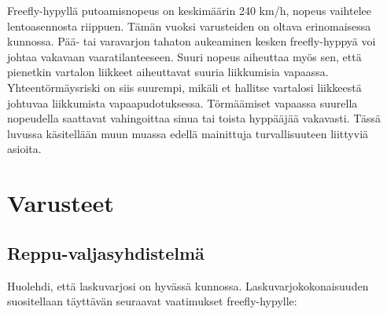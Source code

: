 
Freefly-hypyllä putoamisnopeus on keskimäärin 240 km/h, nopeus vaihtelee lentoasennosta riippuen. Tämän vuoksi varusteiden on oltava erinomaisessa kunnossa. Pää- tai varavarjon tahaton aukeaminen kesken freefly-hyppyä voi johtaa vakavaan vaaratilanteeseen. Suuri nopeus aiheuttaa myös sen, että pienetkin vartalon liikkeet aiheuttavat suuria liikkumisia vapaassa. Yhteentörmäysriski on siis suurempi, mikäli et hallitse vartalosi liikkeestä johtuvaa liikkumista vapaapudotuksessa. Törmäämiset vapaassa suurella nopeudella saattavat vahingoittaa sinua tai toista hyppääjää vakavasti. Tässä luvussa käsitellään muun muassa edellä mainittuja turvallisuuteen liittyviä asioita. 

\section{ Varusteet }
\label{turvallisuus-freehyppaamisessa-varusteet}

\subsection{ Reppu-valjasyhdistelmä }
\label{turvallisuus-freehyppaamisessa-reppu-valjasyhdistelma}


Huolehdi, että laskuvarjosi on hyvässä kunnossa. Laskuvarjokokonaisuuden suositellaan täyttävän seuraavat vaatimukset freefly-hypylle: 

